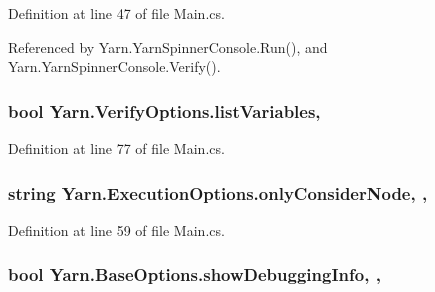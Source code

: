 Definition at line 47 of file Main.\-cs.



Referenced by Yarn.\-Yarn\-Spinner\-Console.\-Run(), and Yarn.\-Yarn\-Spinner\-Console.\-Verify().

\hypertarget{a00182_a062775744f2d7144527fa3bca4b9b3ce}{
\subsubsection[{list\-Variables}]{\setlength{\rightskip}{0pt plus 5cm}bool Yarn.\-Verify\-Options.\-list\-Variables\hspace{0.3cm}{\ttfamily [get]}, {\ttfamily [set]}}}\label{a00182_a062775744f2d7144527fa3bca4b9b3ce}


Definition at line 77 of file Main.\-cs.

\hypertarget{a00093_af4c0062a1d46281d377f87084fde374e}{
\subsubsection[{only\-Consider\-Node}]{\setlength{\rightskip}{0pt plus 5cm}string Yarn.\-Execution\-Options.\-only\-Consider\-Node\hspace{0.3cm}{\ttfamily [get]}, {\ttfamily [set]}, {\ttfamily [inherited]}}}\label{a00093_af4c0062a1d46281d377f87084fde374e}


Definition at line 59 of file Main.\-cs.

\hypertarget{a00031_a89964ea17bd19caf00cb5bff563ed01c}{
\subsubsection[{show\-Debugging\-Info}]{\setlength{\rightskip}{0pt plus 5cm}bool Yarn.\-Base\-Options.\-show\-Debugging\-Info\hspace{0.3cm}{\ttfamily [get]}, {\ttfamily [set]}, {\ttfamily [inherited]}}}\label{a00031_a89964ea17bd19caf00cb5bff563ed01c}


